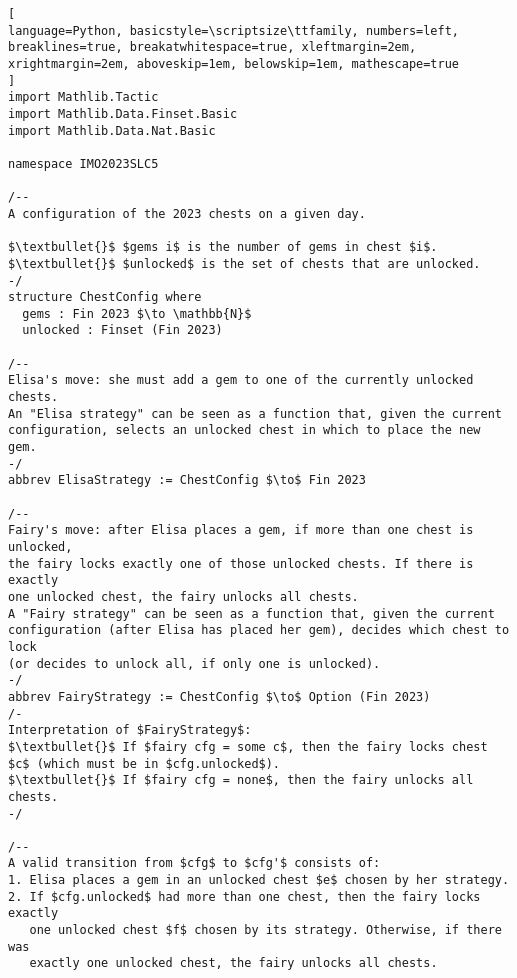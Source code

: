 \begin{tcolorbox}[enhanced, breakable, rounded corners,
    colback=green!5!white, colframe=green!75!black,
    colbacktitle=green!85!black, fonttitle=\bfseries, coltitle=white, title=Lean Theorem for 2023 IMO Shortlist Combinatorics Problem 5]
\setlength{\parskip}{1em}
\begin{lstlisting}[
language=Python, basicstyle=\scriptsize\ttfamily, numbers=left, breaklines=true, breakatwhitespace=true, xleftmargin=2em, xrightmargin=2em, aboveskip=1em, belowskip=1em, mathescape=true
]
import Mathlib.Tactic
import Mathlib.Data.Finset.Basic
import Mathlib.Data.Nat.Basic

namespace IMO2023SLC5

/--
A configuration of the 2023 chests on a given day.

$\textbullet{}$ $gems i$ is the number of gems in chest $i$.
$\textbullet{}$ $unlocked$ is the set of chests that are unlocked.
-/
structure ChestConfig where
  gems : Fin 2023 $\to \mathbb{N}$
  unlocked : Finset (Fin 2023)

/--
Elisa's move: she must add a gem to one of the currently unlocked chests.
An "Elisa strategy" can be seen as a function that, given the current
configuration, selects an unlocked chest in which to place the new gem.
-/
abbrev ElisaStrategy := ChestConfig $\to$ Fin 2023

/--
Fairy's move: after Elisa places a gem, if more than one chest is unlocked,
the fairy locks exactly one of those unlocked chests. If there is exactly
one unlocked chest, the fairy unlocks all chests.
A "Fairy strategy" can be seen as a function that, given the current
configuration (after Elisa has placed her gem), decides which chest to lock
(or decides to unlock all, if only one is unlocked).
-/
abbrev FairyStrategy := ChestConfig $\to$ Option (Fin 2023)
/-
Interpretation of $FairyStrategy$:
$\textbullet{}$ If $fairy cfg = some c$, then the fairy locks chest $c$ (which must be in $cfg.unlocked$).
$\textbullet{}$ If $fairy cfg = none$, then the fairy unlocks all chests.
-/

/--
A valid transition from $cfg$ to $cfg'$ consists of:
1. Elisa places a gem in an unlocked chest $e$ chosen by her strategy.
2. If $cfg.unlocked$ had more than one chest, then the fairy locks exactly
   one unlocked chest $f$ chosen by its strategy. Otherwise, if there was
   exactly one unlocked chest, the fairy unlocks all chests.


\end{lstlisting}
\end{tcolorbox}
